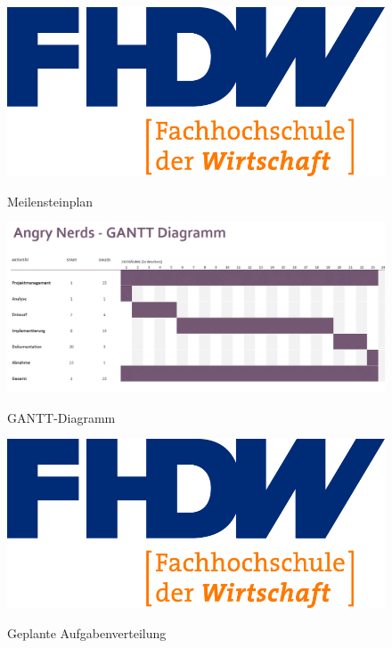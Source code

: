 \begin{figure}[H]
\centering
\begin{minipage}[t]{1\textwidth} %
\caption{Meilensteinplan} %
\includegraphics[width=1\textwidth]{img/fhdw}\\ %
\end{minipage}
\end{figure}

\begin{figure}[H]
\centering
\begin{minipage}[t]{1\textwidth} %
\caption{GANTT-Diagramm} %
\includegraphics[width=1\textwidth]{img/GANTT}\\ %
\end{minipage}
\end{figure}

\begin{figure}[H]
\centering
\begin{minipage}[t]{1\textwidth} %
\caption{Geplante Aufgabenverteilung} %
\includegraphics[width=1\textwidth]{img/fhdw}\\ %
\end{minipage}
\end{figure}

